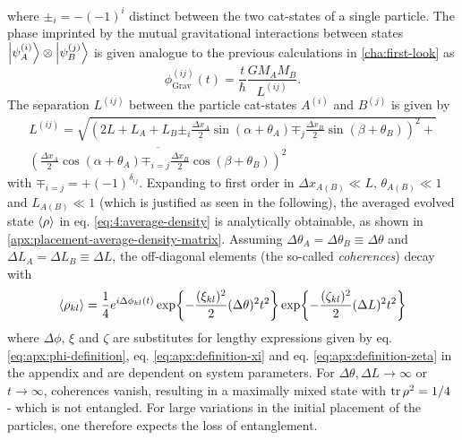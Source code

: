 where $\pm_i = -(-1)^{i}$ distinct between the two cat-states of a single particle.
The phase imprinted by the mutual gravitational interactions between states $\ket{\psi^{(i)}_A}\otimes\ket{\psi^{(j)}_B}$ is given analogue to the previous calculations in \cref{cha:first-look} as
\begin{equation}\label{eq:4:phi-grav}
  \phi^{(ij)}_\mathrm{Grav}(t) = \frac{t}{\hbar} \frac{G M_A M_B}{L^{(ij)}} .
\end{equation}
The separation $L^{(ij)}$ between the particle cat-states $A^{(i)}$ and $B^{(j)}$ is given by
\begin{multline}\label{eq:4:L-gravity}
  L^{(ij)} = \sqrt{\left(2L + L_A + L_B \pm_i \frac{\Delta x_A}{2}\sin(\alpha + \theta_A) \mp_j \frac{\Delta x_B}{2}\sin(\beta + \theta_B)\right)^2 +} \\ \overline{\left(\frac{\Delta x_A}{2}\cos(\alpha + \theta_A) \mp_{i=j} \frac{\Delta x_B}{2}\cos(\beta + \theta_B)\right)^2}
\end{multline}
with $\mp_{i=j} = +(-1)^{\delta_{ij}}$.
Expanding to first order in $\Delta x_{A(B)} \ll L$, $\theta_{A(B)} \ll 1$ and $L_{A(B)} \ll 1$ (which is justified as seen in the following), the averaged evolved state 
$\left\langle\rho\right\rangle$ in eq. \eqref{eq:4:average-density} is analytically obtainable, as shown in \cref{apx:placement-average-density-matrix}.
Assuming $\Delta \theta_A = \Delta \theta_B \equiv \Delta\theta$ and $\Delta L_A = \Delta L_B \equiv \Delta L$, the off-diagonal elements (the so-called \textit{coherences}) decay with
\begin{equation}\label{eq:4:average-density-element}
  \left\langle\rho_{kl}\right\rangle = \frac{1}{4} e^{i \Delta \phi_{kl}(t)} \exp{-\frac{(\xi_{kl})^2}{2} (\Delta\theta)^2 t^2} \exp{-\frac{(\zeta_{kl})^2}{2} (\Delta L)^2 t^2}
\end{equation}
where $\Delta \phi$, $\xi$ and $\zeta$ are substitutes for lengthy expressions given by eq. \eqref{eq:apx:phi-definition}, eq. \eqref{eq:apx:definition-xi} and eq. \eqref{eq:apx:definition-zeta} in the appendix and are dependent on system parameters.
For $\Delta \theta, \Delta L \rightarrow \infty$ or $t\rightarrow \infty$, coherences vanish, resulting in a maximally mixed state with $\tr\rho^2 = 1/4$ - which is not entangled.
For large variations in the initial placement of the particles, one therefore expects the loss of entanglement.

